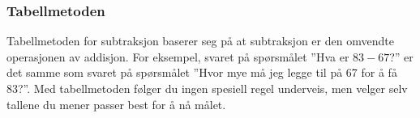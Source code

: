 \subsubsection{Tabellmetoden}
Tabellmetoden for subtraksjon baserer seg på at subtraksjon er den omvendte operasjonen av addisjon. For eksempel, svaret på spørsmålet ''Hva er $ 83-67 $?'' er det samme som svaret på spørsmålet ''Hvor mye må jeg legge til på 67 for å få 83?''. Med tabellmetoden følger du ingen spesiell regel underveis, men velger selv tallene du mener passer best for å nå målet.\\
\begin{center}
\parbox{0.35\linewidth}{
} \qquad
\parbox{0.35\linewidth}{
} \\[12pt]
\parbox{0.35\linewidth}{
	} \qquad 
\parbox{0.4\linewidth}{
	}
\end{center}
